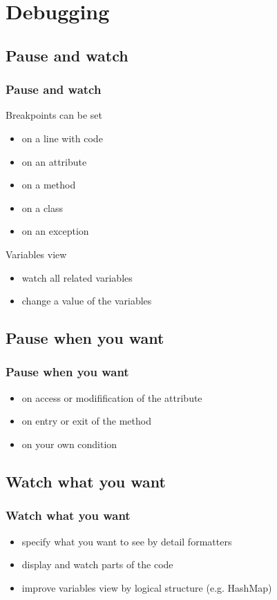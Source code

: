 \documentclass{beamer}
\begin{document}
\section{Debugging}

\subsection{Pause and watch}
\begin{frame}[fragile]
\frametitle{Pause and watch}
Breakpoints can be set
\begin{itemize}
\item on a line with code
\item on an attribute
\item on a method
\item on a class
\item on an exception
\end{itemize}
Variables view
\begin{itemize}
\item watch all related variables
\item change a value of the variables
\end{itemize}
\end{frame}

\subsection{Pause when you want}
\begin{frame}[fragile]
\frametitle{Pause when you want}
\begin{itemize}
\item on access or modifification of the attribute
\item on entry or exit of the method
\item on your own condition
\end{itemize}
\end{frame}

\subsection{Watch what you want}
\begin{frame}[fragile]
\frametitle{Watch what you want}
\begin{itemize}
\item specify what you want to see by detail formatters
\item display and watch parts of the code
\item improve variables view by logical structure (e.g. HashMap)
\end{itemize}  
\end{frame}
\end{document}
